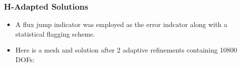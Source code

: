 \frame
{
  \frametitle{H-Adapted Solutions}
  \begin{itemize}[<+->]
    \item A flux jump indicator was employed as the error indcator along with a statistical flagging scheme.
    \item Here is a mesh and solution after 2 adaptive refinements containing 10800 DOFs:
      \begin{figure}[!htb]
        \begin{center}
        \end{center}
      \end{figure}
  \end{itemize}
}

